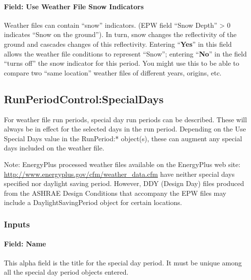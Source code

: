 \paragraph{Field: Use Weather File Snow Indicators}\label{field-use-weather-file-snow-indicators-1}

Weather files can contain ``snow'' indicators. (EPW field ``Snow Depth'' \textgreater{} 0 indicates ``Snow on the ground''). In turn, snow changes the reflectivity of the ground and cascades changes of this reflectivity. Entering ``\textbf{Yes}'' in this field allows the weather file conditions to represent ``Snow''; entering ``\textbf{No}'' in the field ``turns off'' the snow indicator for this period. You might use this to be able to compare two ``same location'' weather files of different years, origins, etc.

\subsection{RunPeriodControl:SpecialDays}\label{runperiodcontrolspecialdays}

For weather file run periods, special day run periods can be described. These will always be in effect for the selected days in the run period. Depending on the Use Special Days value in the RunPeriod:* object(s), these can augment any special days included on the weather file.

\begin{callout}
Note: EnergyPlus processed weather files available on the EnergyPlus web site: \url{http://www.energyplus.gov/cfm/weather\_data.cfm} have neither special days specified nor daylight saving period. However, DDY (Design Day) files produced from the ASHRAE Design Conditions that accompany the EPW files may include a DaylightSavingPeriod object for certain locations.
\end{callout}

\subsubsection{Inputs}\label{inputs-6-013}

\paragraph{Field: Name}\label{field-name-6-010}

This alpha field is the title for the special day period. It must be unique among all the special day period objects entered.

